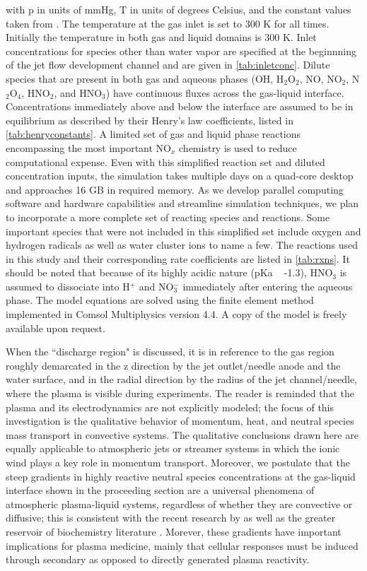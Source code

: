 with p in units of mmHg, T in units of degrees Celsius, and the constant values taken from \cite{dimian2014integrated}.  The temperature at the gas inlet is set to 300 K for all times. Initially the temperature in both gas and liquid domains is 300 K. Inlet concentrations for species other than water vapor are specified at the beginnning of the jet flow development channel and are given in \cref{tab:inletconc}. Dilute species that are present in both gas and aqueous phases (OH, H$_2$O$_2$, NO, NO$_2$, N$_2$O$_4$, HNO$_2$, and HNO$_3$) have continuous fluxes across the gas-liquid interface. Concentrations immediately above and below the interface are assumed to be in equilibrium as described by their Henry's law coefficients, listed in \cref{tab:henryconstants}. A limited set of gas and liquid phase reactions encompassing the most important NO$_x$ chemistry is used to reduce computational expense. Even with this simplified reaction set and diluted concentration inputs, the simulation takes multiple days on a quad-core desktop and approaches 16 GB in required memory. As we develop parallel computing software and hardware capabilities and streamline simulation techniques, we plan to incorporate a more complete set of reacting species and reactions.  Some important species that were not included in this simplified set include oxygen and hydrogen radicals as well as water cluster ions to name a few. The reactions used in this study and their corresponding rate coefficients are listed in \cref{tab:rxns}. It should be noted that because of its highly acidic nature (pKa ~ -1.3), HNO$_3$ is assumed to dissociate into H$^+$ and NO$_3^-$ immediately after entering the aqueous phase. The model equations are solved using the finite element method implemented in Comsol Multiphysics version 4.4. A copy of the model is freely available upon request.

When the ``discharge region" is discussed, it is in reference to the gas region roughly demarcated in the z direction by the jet outlet/needle anode and the water surface, and in the radial direction by the radius of the jet channel/needle, where the plasma is visible during experiments. The reader is reminded that the plasma and its electrodynamics are not explicitly modeled; the focus of this investigation is the qualitative behavior of momentum, heat, and neutral species mass transport in convective systems. The qualitative conclusions drawn here are equally applicable to atmospheric jets or streamer systems in which the ionic wind plays a key role in momentum transport. Moreover, we postulate that the steep gradients in highly reactive neutral species concentrations at the gas-liquid interface shown in the proceeding section are a universal phenomena of atmospheric plasma-liquid systems, regardless of whether they are convective or diffusive; this is consistent with the recent research by \cite{Chen2014a} as well as the greater reservoir of biochemistry literature \cite{Halliwell}. Morever, these gradients have important implications for plasma medicine, mainly that cellular responses must be induced through secondary as opposed to directly generated plasma reactivity.

